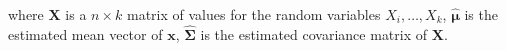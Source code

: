 \noindent where
$\mathbf{X}$ is a $n \times k$ matrix of values
for the random variables $X_i, \dots, X_k$,
$\hat{\boldsymbol{\mu}}$ is the estimated mean vector of $\mathbf{x}$,
$\hat{\boldsymbol{\Sigma}}$ is the estimated covariance matrix of $\mathbf{X}$.